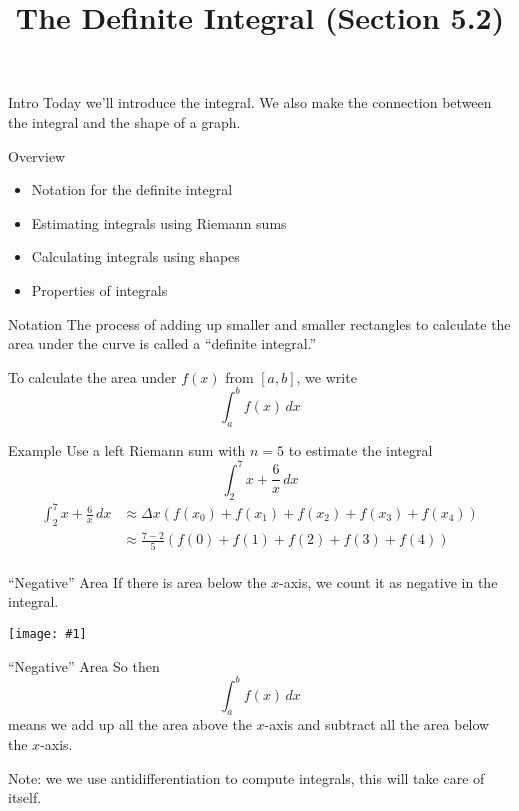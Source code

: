 \documentclass[t]{beamer}
\title{The Definite Integral (Section 5.2)}
\date{}
\newcommand{\img}[1]{
\vfill
\begin{center}
\texttt{[image: \#1]}
\end{center}
\vfill
}
\begin{document}
\frame{\titlepage}

\begin{frame}{Intro}
Today we'll introduce the integral.  We also make the connection between the integral and the shape of a graph.
\end{frame}


\begin{frame}{Overview}
\begin{itemize}
\item Notation for the definite integral
\item Estimating integrals using Riemann sums
\item Calculating integrals using shapes
\item Properties of integrals
\end{itemize}
\end{frame}

\begin{frame}{Notation}
The process of adding up smaller and smaller rectangles to calculate the area under the curve is called a ``definite integral.''

To calculate the area under $f(x)$ from $[a,b]$, we write
$$ \int_a^b f(x) \, dx$$
\end{frame}

\begin{frame}{Example}
Use a left Riemann sum with $n = 5$ to estimate the integral
$$ \int_2^7 x + \frac{6}{x} \, dx$$
\begin{align*}
 \int_2^7 x + \frac{6}{x} \, dx & \approx \Delta x ( f(x_0) + f(x_1) + f(x_2) + f(x_3) + f(x_4)) \\
 & \approx \frac{7-2}{5} ( f(0) + f(1) + f(2) + f(3) + f(4)) \\
\end{align*}
\end{frame}

\begin{frame}{``Negative'' Area}
If there is area below the $x$-axis, we count it as negative in the integral.

\img{negative_area}
\end{frame}

\begin{frame}{``Negative'' Area}
So then 
$$\int_a^b f(x) \, dx$$
means we add up all the area above the $x$-axis  and subtract all the area below the $x$-axis.

Note: we we use antidifferentiation to compute integrals, this will take care of itself.
\end{frame}
\end{document}
